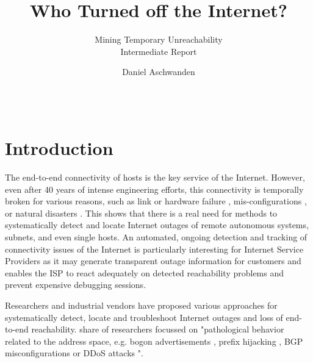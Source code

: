 \documentclass{sigcomm-alternate}
\begin{document}
 
\title{Who Turned off the Internet?} 
\subtitle{Mining Temporary Unreachability\\ \Large Intermediate Report }

\author{ \alignauthor Daniel Aschwanden\\
\\
\\
}

\maketitle 
\section{Introduction}
The end-to-end connectivity of hosts is the key service of the
Internet. However, even after 40 years of intense engineering efforts,
this connectivity is temporally broken for various reasons, such as link
or hardware failure \cite{Markopoulou:2008}, mis-configurations \cite{Mahajan:2002}, or natural disasters \cite{Dainotti:2012:EBH,Schulman:2011}.
This shows that there is a real need for methods to systematically detect
and locate Internet outages of remote autonomous systems, subnets,
and even single hosts. An automated, ongoing detection and tracking
of connectivity issues of the Internet is particularly interesting
for Internet Service Providers as it may generate transparent outage
information for customers and enables the ISP to react adequately on
detected reachability problems and prevent expensive debugging sessions.

Researchers and industrial vendors have proposed various approaches for
systematically detect, locate and troubleshoot Internet outages and loss
of end-to-end reachability. %
share of researchers focussed on "pathological behavior related to the
address space, e.g. bogon advertisements \cite{Feamster:2005}, prefix
hijacking \cite{Zhang:2010}, BGP misconfigurations \cite{Mahajan:2002}
or DDoS attacks \cite{Chen:2001}"\cite{Bush:Optometry}.
\end{document}
